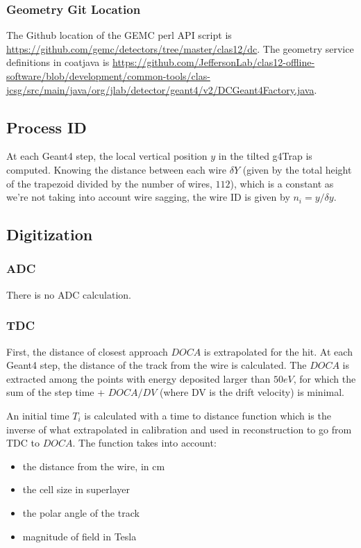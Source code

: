 \subsubsection{Geometry Git Location}
The Github location of the GEMC perl API script is \url{https://github.com/gemc/detectors/tree/master/clas12/dc}.
The geometry service definitions in coatjava is \url{https://github.com/JeffersonLab/clas12-offline-software/blob/development/common-tools/clas-jcsg/src/main/java/org/jlab/detector/geant4/v2/DCGeant4Factory.java}.

\subsection{Process ID}
At each Geant4 step, the local vertical position $y$ in the tilted g4Trap is computed. Knowing the distance
between each wire $\delta Y$ (given by the total height of the trapezoid divided by the number of wires, $112$), which is a constant as we're not taking into
account wire sagging, the wire ID is given by $n_i = y / \delta y$.

\subsection{Digitization}

\subsubsection{ADC}
There is no ADC calculation.

\subsubsection{TDC}
First, the distance of closest approach $DOCA$ is extrapolated for the hit. At each Geant4 step, the distance of the track from the wire is calculated.
The $DOCA$ is extracted among the points with energy deposited larger than $50 eV$, for which the sum of the step time + $DOCA / DV$ (where DV is the drift velocity) is minimal.

An initial time $T_i$ is calculated with a time to distance function which is the inverse of what extrapolated in calibration and used in reconstruction to go from TDC to $DOCA$.
The function takes into account:

\begin{itemize}
	\item the distance from the wire, in cm
	\item the cell size in superlayer
	\item the polar angle of the track
	\item magnitude of field in Tesla
\end{itemize}

